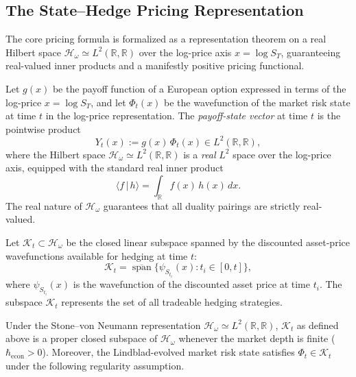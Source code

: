 \subsection{The State--Hedge Pricing Representation}

The core pricing formula is formalized as a representation theorem on a real Hilbert
space $\mathcal{H}_\omega \simeq L^2(\mathbb{R}, \mathbb{R})$ over the log-price
axis $x = \log S_T$, guaranteeing real-valued inner products and a manifestly
positive pricing functional.

\begin{definition}\label{def:payoff-state-vector}
Let $g(x)$ be the payoff function of a European option expressed in terms of the
log-price $x = \log S_T$, and let $\Phi_t(x)$ be the wavefunction of the market
risk state at time $t$ in the log-price representation. The \emph{payoff-state
vector} at time $t$ is the pointwise product
\begin{equation}\label{eq:payoff-state}
    Y_t(x) := g(x) \, \Phi_t(x) \in L^2(\mathbb{R}, \mathbb{R}),
\end{equation}
where the Hilbert space $\mathcal{H}_\omega \simeq L^2(\mathbb{R}, \mathbb{R})$ is
a \emph{real} $L^2$ space over the log-price axis, equipped with the standard real
inner product
\begin{equation*}
    \langle f \,|\, h \rangle = \int_{\mathbb{R}} f(x) \, h(x) \, dx.
\end{equation*}
The real nature of $\mathcal{H}_\omega$ guarantees that all duality pairings are
strictly real-valued.
\end{definition}

\begin{definition}\label{def:hedgeable-subspace-time}
Let $\mathcal{K}_t \subset \mathcal{H}_\omega$ be the closed linear subspace spanned
by the discounted asset-price wavefunctions available for hedging at time $t$:
\begin{equation*}
    \mathcal{K}_t = \overline{\operatorname{span}}
        \{\psi_{S_{t_i}}(x) : t_i \in [0, t]\},
\end{equation*}
where $\psi_{S_{t_i}}(x)$ is the wavefunction of the discounted asset price at time
$t_i$. The subspace $\mathcal{K}_t$ represents the set of all tradeable hedging
strategies.
\end{definition}

\begin{lemma}
\label{lem:Kt-closed}
Under the Stone--von Neumann representation $\mathcal{H}_\omega \simeq
L^2(\mathbb{R},\mathbb{R})$, $\mathcal{K}_t$ as defined above is a proper
closed subspace of $\mathcal{H}_\omega$ whenever the market depth is finite
($\hbar_{\mathrm{econ}} > 0$). Moreover, the Lindblad-evolved market risk state
satisfies $\Phi_t \in \mathcal{K}_t$ under the following regularity assumption.
\end{lemma}

